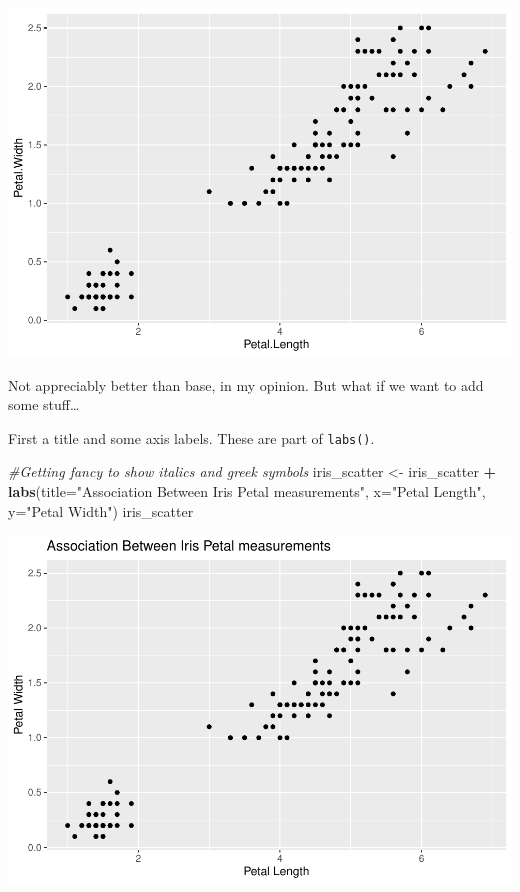 \documentclass[]{article}
\newenvironment{Shaded}{\begin{snugshade}}{\end{snugshade}}
\newcommand{\CommentTok}[1]{\textcolor[rgb]{0.56,0.35,0.01}{\textit{#1}}}
\newcommand{\DataTypeTok}[1]{\textcolor[rgb]{0.13,0.29,0.53}{#1}}
\newcommand{\KeywordTok}[1]{\textcolor[rgb]{0.13,0.29,0.53}{\textbf{#1}}}
\newcommand{\NormalTok}[1]{#1}
\newcommand{\OperatorTok}[1]{\textcolor[rgb]{0.81,0.36,0.00}{\textbf{#1}}}
\newcommand{\StringTok}[1]{\textcolor[rgb]{0.31,0.60,0.02}{#1}}
\begin{document}
\includegraphics{figures/unnamed-chunk-4-1.pdf}

Not appreciably better than base, in my opinion. But what if we want to
add some stuff\ldots{}

First a title and some axis labels. These are part of \texttt{labs()}.

\begin{Shaded}
\begin{Highlighting}[]
\CommentTok{#Getting fancy to show italics and greek symbols}
\NormalTok{iris_scatter <-}\StringTok{ }\NormalTok{iris_scatter }\OperatorTok{+}
\StringTok{  }\KeywordTok{labs}\NormalTok{(}\DataTypeTok{title=}\StringTok{"Association Between Iris Petal measurements"}\NormalTok{,}
                     \DataTypeTok{x=}\StringTok{"Petal Length"}\NormalTok{, }\DataTypeTok{y=}\StringTok{"Petal Width"}\NormalTok{)}
\NormalTok{iris_scatter}
\end{Highlighting}
\end{Shaded}

\includegraphics{figures/unnamed-chunk-5-1.pdf}
\end{document}
